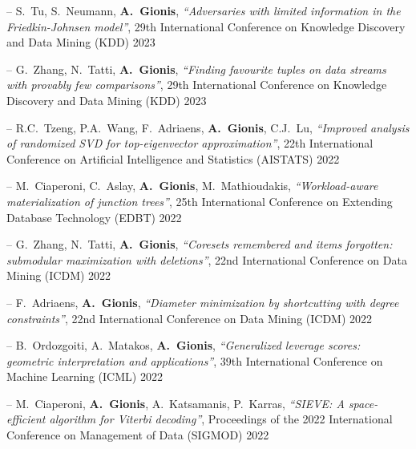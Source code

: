 \documentclass[a4paper,11pt]{article}
\begin{document}
\item[--] 
{S.\ Tu, S.\ Neumann, \textbf{A.\ Gionis}},
{\em ``Adversaries with limited information in the Friedkin-Johnsen model''},
29th International Conference on Knowledge Discovery and Data Mining (KDD) 2023

\item[--] 
{G.\ Zhang, N.\ Tatti, \textbf{A.\ Gionis}},
{\em ``Finding favourite tuples on data streams with provably few comparisons''},
29th International Conference on Knowledge Discovery and Data Mining (KDD) 2023

\item[--] 
{R.C.\ Tzeng, P.A.\ Wang, F.\ Adriaens, \textbf{A.\ Gionis}, C.J.\ Lu},
{\em ``Improved analysis of randomized SVD for top-eigenvector approximation''},
22th International Conference on Artificial Intelligence and Statistics (AISTATS) 2022

\item[--] 
{M.\ Ciaperoni, C.\ Aslay, \textbf{A.\ Gionis}, M.\ Mathioudakis},
{\em ``Workload-aware materialization of junction trees''},
25th International Conference on Extending Database Technology (EDBT) 2022


\item[--] 
{G.\ Zhang, N.\ Tatti, \textbf{A.\ Gionis}},
{\em ``Coresets remembered and items forgotten: submodular maximization with deletions''},
22nd International Conference on Data Mining (ICDM) 2022

\item[--] 
{F.\ Adriaens, \textbf{A.\ Gionis}},
{\em ``Diameter minimization by shortcutting with degree constraints''},
22nd International Conference on Data Mining (ICDM) 2022

\item[--] 
{B.\ Ordozgoiti, A.\ Matakos, \textbf{A.\ Gionis}},
{\em ``Generalized leverage scores: geometric interpretation and applications''},
39th International Conference on Machine Learning (ICML) 2022

\item[--] 
{M.\ Ciaperoni, \textbf{A.\ Gionis}, A.\ Katsamanis, P.\ Karras},
{\em ``SIEVE: A space-efficient algorithm for Viterbi decoding''},
Proceedings of the 2022 International Conference on Management of Data (SIGMOD) 2022
\end{document}

